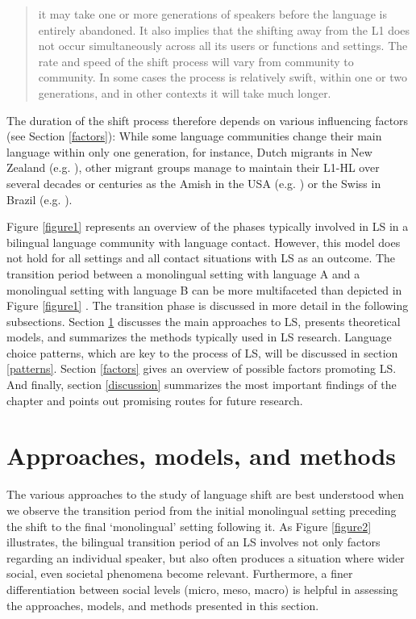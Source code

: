 \documentclass[output=paper,
modfonts
]{langscibook}
\begin{document}
\begin{quote}
it may take one or more generations of speakers before the language is entirely abandoned. It also implies that the shifting away from the L1 does not occur simultaneously across all its users or functions and settings. The rate and speed of the shift process will vary from community to community. In some cases the process is relatively swift, within one or two generations, and in other contexts it will take much longer.
\end{quote}

The duration of the shift process therefore depends on various influencing factors (see Section \ref{factors}): While some language communities change their main language within only one generation, for instance, Dutch migrants in New Zealand (e.g. \citealt{VanRijk2017}), other migrant groups manage to maintain their L1-HL over several decades or centuries as the Amish  in the USA (e.g. \citealt{Sağlamel2013}) or the Swiss in Brazil (e.g. \citealt{Karnopp}).

Figure \ref{figure1} represents an overview of the phases typically involved in LS in a bilingual language community with language contact. However, this model does not hold for all settings and all contact situations with LS as an outcome. The transition period between a monolingual setting with language A and a monolingual setting with language B can be more multifaceted than depicted in Figure \ref{figure1} . The transition phase is discussed in more detail in the following subsections. Section \ref{approaches} discusses the main approaches to LS, presents theoretical models, and summarizes the methods typically used in LS research. Language choice patterns, which are key to the process of LS, will be discussed in section \ref{patterns}. Section \ref{factors} gives an overview of possible factors promoting LS. And finally, section \ref{discussion} summarizes the most important findings of the chapter and points out promising routes for future research.

\section{Approaches, models, and methods}
\label{approaches}

\noindent The various approaches to the study of language shift are best understood when we observe the transition period from the initial monolingual setting preceding the shift to the final ‘monolingual' setting following it. As Figure \ref{figure2} illustrates, the bilingual transition period of an LS involves not only factors regarding an individual speaker, but also often produces a situation where wider social, even societal phenomena become relevant. Furthermore, a finer differentiation between social levels (micro, meso, macro) is helpful in assessing the approaches, models, and methods presented in this section.
\end{document}
